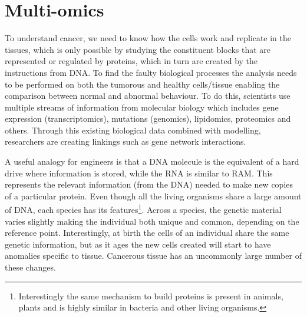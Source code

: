 
\section{Multi-omics} \label{s:multi-omics}


To understand cancer, we need to know how the cells work and replicate in the tissues, which is only possible by studying the constituent blocks that are represented or regulated by proteins, which in turn are created by the instructions from DNA. To find the faulty biological processes the analysis needs to be performed on both the tumorous and healthy cells/tissue enabling the comparison between normal and abnormal behaviour. To do this, scientists use multiple streams of information from molecular biology which includes gene expression (transcriptomics), mutations (genomics), lipidomics, proteomics and others. Through this existing biological data combined with modelling, researchers are creating linkings such as gene network interactions. 




A useful analogy for engineers is that a DNA molecule is the equivalent of a hard drive where information is stored, while the RNA is similar to RAM. This represents the relevant information (from the DNA) needed to make new copies of a particular protein. Even though all the living organisms share a large amount of DNA, each species has its features\footnote{Interestingly the same mechanism to build proteins is present in animals, plants and is highly similar in bacteria and other living organisms.}. Across a species, the genetic material varies slightly making the individual both unique and common, depending on the reference point. Interestingly, at birth the cells of an individual share the same genetic information, but as it ages the new cells created will start to have anomalies specific to tissue. Cancerous tissue has an uncommonly large number of these changes.

